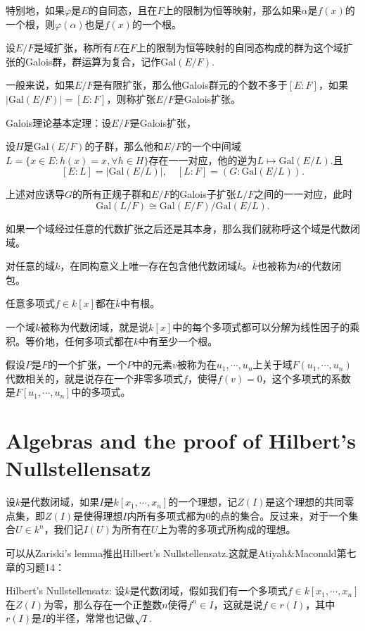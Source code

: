 特别地，如果$\varphi$是$E$的自同态，且在$F$上的限制为恒等映射，那么如果$\alpha$是$f(x)$的一个根，则$\varphi(\alpha)$也是$f(x)$的一个根。

\para 设$E/F$是域扩张，称所有$E$在$F$上的限制为恒等映射的自同态构成的群为这个域扩张的Galois群，群运算为复合，记作$\mathrm{Gal}(E/F)$.

一般来说，如果$E/F$是有限扩张，那么他Galois群元的个数不多于$[E:F]$，如果$|\mathrm{Gal}(E/F)|=[E:F]$，则称扩张$E/F$是Galois扩张。

\theo Galois理论基本定理：设$E/F$是Galois扩张，

 设$H$是$\mathrm{Gal}(E/F)$的子群，那么他和$E/F$的一个中间域$L=\{x\in E:h(x)=x,\forall h\in H\}$存在一一对应，他的逆为$L\mapsto \mathrm{Gal}(E/L)$.且
\[
[E:L]=|\mathrm{Gal}(E/L)|,\quad [L:F]=(G:\mathrm{Gal}(E/L)).
\]

 上述对应诱导$G$的所有正规子群和$E/F$的Galois子扩张$L/F$之间的一一对应，此时
\[
	\mathrm{Gal}(L/F)\cong \mathrm{Gal}(E/F)/\mathrm{Gal}(E/L).
\]

如果一个域经过任意的代数扩张之后还是其本身，那么我们就称呼这个域是代数闭域。

\theo 对任意的域$k$，在同构意义上唯一存在包含他代数闭域$\bar{k}$。$\bar{k}$也被称为$k$的代数闭包。

\pro 任意多项式$f\in k[x]$都在$\bar{k}$中有根。

\para 一个域$k$被称为代数闭域，就是说$k[x]$中的每个多项式都可以分解为线性因子的乘积。等价地，任何多项式都在$k$中有至少一个根。

\para 假设$P$是$F$的一个扩张，一个$P$中的元素$v$被称为在$u_1,\cdots ,u_n$上关于域$F(u_1,\cdots ,u_n)$代数相关的，就是说存在一个非零多项式$f$，使得$f(v)=0$，这个多项式的系数是$F[u_1,\cdots ,u_n]$中的多项式。

\section{Algebras and the proof of Hilbert's Nullstellensatz}

\para 设$k$是代数闭域，如果$I$是$k[x_1,\cdots,x_n]$的一个理想，记$Z(I)$是这个理想的共同零点集，即$Z(I)$是使得理想$I$内所有多项式都为$0$的点的集合。反过来，对于一个集合$U\in k^n$，我们记$I(U)$为所有在$U$上为零的多项式所构成的理想。

可以从Zariski's lemma推出Hilbert's Nullstellensatz.这就是Atiyah\&Maconald第七章的习题14：

\theo Hilbert's Nullstellensatz: 设$k$是代数闭域，假如我们有一个多项式$f\in k[x_1,\cdots,x_n]$在$Z(I)$为零，那么存在一个正整数$n$使得$f^n\in I$，这就是说$f\in r(I)$，其中$r(I)$是$I$的半径，常常也记做$\sqrt{I}$.

